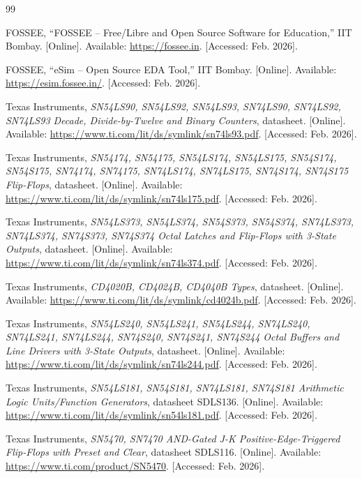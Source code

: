 \documentclass[12pt,a4paper]{report}
\begin{document}
\begin{thebibliography}{99}

FOSSEE, ``FOSSEE -- Free/Libre and Open Source Software for Education,''
IIT Bombay. [Online]. Available: \url{https://fossee.in}.
[Accessed: Feb. 2026].

FOSSEE, ``eSim -- Open Source EDA Tool,'' IIT Bombay.
[Online]. Available: \url{https://esim.fossee.in/}.
[Accessed: Feb. 2026].

Texas Instruments, \emph{SN54LS90, SN54LS92, SN54LS93, SN74LS90,
SN74LS92, SN74LS93 Decade, Divide-by-Twelve and Binary Counters},
datasheet. [Online].
Available: \url{https://www.ti.com/lit/ds/symlink/sn74ls93.pdf}.
[Accessed: Feb. 2026].

Texas Instruments, \emph{SN54174, SN54175, SN54LS174, SN54LS175, SN54S174,
SN54S175, SN74174, SN74175, SN74LS174, SN74LS175, SN74S174, SN74S175
Flip-Flops}, datasheet. [Online].
Available: \url{https://www.ti.com/lit/ds/symlink/sn74ls175.pdf}.
[Accessed: Feb. 2026].

Texas Instruments, \emph{SN54LS373, SN54LS374, SN54S373, SN54S374,
SN74LS373, SN74LS374, SN74S373, SN74S374 Octal Latches and Flip-Flops
with 3-State Outputs}, datasheet. [Online].
Available: \url{https://www.ti.com/lit/ds/symlink/sn74ls374.pdf}.
[Accessed: Feb. 2026].

Texas Instruments, \emph{CD4020B, CD4024B, CD4040B Types}, datasheet.
[Online].
Available: \url{https://www.ti.com/lit/ds/symlink/cd4024b.pdf}.
[Accessed: Feb. 2026].

Texas Instruments, \emph{SN54LS240, SN54LS241, SN54LS244, SN74LS240,
SN74LS241, SN74LS244, SN74S240, SN74S241, SN74S244 Octal Buffers and
Line Drivers with 3-State Outputs}, datasheet. [Online].
Available: \url{https://www.ti.com/lit/ds/symlink/sn74ls244.pdf}.
[Accessed: Feb. 2026].

Texas Instruments, \emph{SN54LS181, SN54S181, SN74LS181, SN74S181
Arithmetic Logic Units/Function Generators}, datasheet SDLS136. [Online].
Available: \url{https://www.ti.com/lit/ds/symlink/sn54ls181.pdf}.
[Accessed: Feb. 2026].

Texas Instruments, \emph{SN5470, SN7470 AND-Gated J-K
Positive-Edge-Triggered Flip-Flops with Preset and Clear}, datasheet
SDLS116. [Online].
Available: \url{https://www.ti.com/product/SN5470}.
[Accessed: Feb. 2026].


\end{thebibliography}
\end{document}
